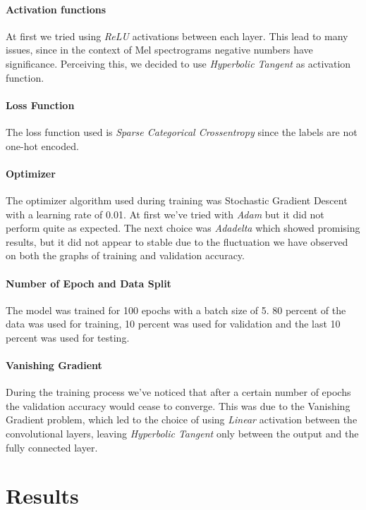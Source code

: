 \documentclass{article}
\begin{document}
    \paragraph{Activation functions}
    At first we tried using \emph{ReLU} activations between each layer. This lead to many issues,
    since in the context of Mel spectrograms negative numbers have significance. Perceiving this,
    we decided to use \emph{Hyperbolic Tangent} as activation function.

    \paragraph{Loss Function}
    The loss function used is \emph{Sparse Categorical Crossentropy} since the labels are not one-hot encoded.

    \paragraph{Optimizer}
    The optimizer algorithm used during training was Stochastic Gradient Descent with a learning rate of 0.01.
    At first we've tried with \emph{Adam} but it did not perform quite as expected. The next choice
    was \emph{Adadelta} which showed promising results, but it did not appear to stable due to the
    fluctuation we have observed on both the graphs of training and validation accuracy.

    \paragraph{Number of Epoch and Data Split}
    The model was trained for 100 epochs with a batch size of 5. 80 percent of the data was used
    for training, 10 percent was used for validation and the last 10 percent was used for testing.

    \paragraph{Vanishing Gradient}

    During the training process we've noticed that after a certain number of epochs
    the validation accuracy would cease to converge. This was due to the Vanishing
    Gradient problem, which led to the choice of using \emph{Linear} activation between the
    convolutional layers, leaving \emph{Hyperbolic Tangent} only between the output and
    the fully connected layer.

    \section{Results}
\end{document}
